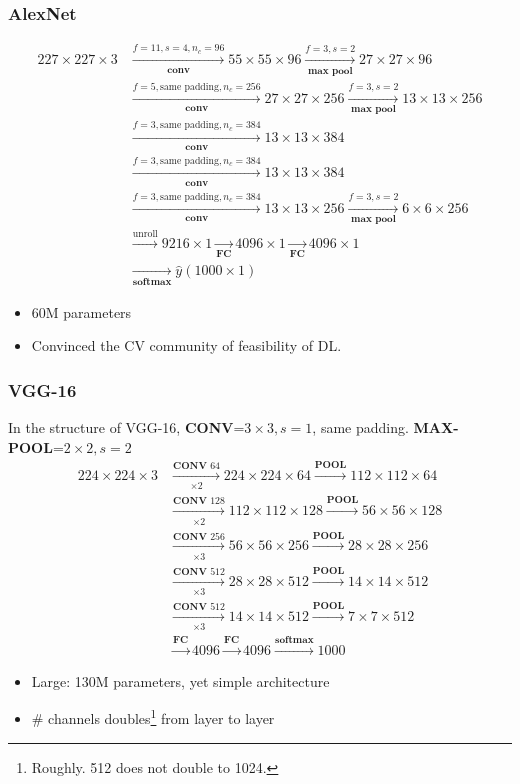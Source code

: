 \subsubsection{AlexNet}
\begin{align*}
  227\times 227\times 3&\xrightarrow[\textbf{conv}]{f=11,s=4,n_c=96}55\times 55\times 96\xrightarrow[\textbf{max pool}]{f=3,s=2}27\times 27\times 96\\
  &\xrightarrow[\textbf{conv}]{f=5,\text{same padding},n_c=256}27\times 27\times 256\xrightarrow[\textbf{max pool}]{f=3,s=2}13\times 13\times 256\\
  &\xrightarrow[\textbf{conv}]{f=3,\text{same padding},n_c=384}13\times 13\times 384\\
  &\xrightarrow[\textbf{conv}]{f=3,\text{same padding},n_c=384}13\times 13\times 384\\
  &\xrightarrow[\textbf{conv}]{f=3,\text{same padding},n_c=384}13\times 13\times 256\xrightarrow[\textbf{max pool}]{f=3,s=2}6\times 6\times 256\\
  &\xrightarrow{\text{unroll}}9216\times 1\xrightarrow[\textbf{FC}]{}4096\times 1\xrightarrow[\textbf{FC}]{}4096\times 1\\
  &\xrightarrow[\textbf{softmax}]{}\hat{y}(1000\times 1)
\end{align*}
\begin{itemize}
  \item 60M parameters
  \item Convinced the CV community of feasibility of DL.
\end{itemize}
\subsubsection{VGG-16}
In the structure of VGG-16, \textbf{CONV}=$3\times 3, s=1$, same padding. \textbf{MAX-POOL}=$2\times 2, s=2$
\begin{align*}
  224\times 224\times 3&\xrightarrow[\times 2]{\textbf{CONV } 64}224\times 224\times 64\xrightarrow{\textbf{POOL}}112\times 112\times 64\\
  &\xrightarrow[\times 2]{\textbf{CONV } 128}112\times 112\times 128\xrightarrow{\textbf{POOL}}56\times 56\times 128\\
  &\xrightarrow[\times 3]{\textbf{CONV } 256}56\times 56\times 256\xrightarrow{\textbf{POOL}}28\times 28\times 256\\
  &\xrightarrow[\times 3]{\textbf{CONV } 512}28\times 28\times 512\xrightarrow{\textbf{POOL}}14\times 14\times 512\\
  &\xrightarrow[\times 3]{\textbf{CONV } 512}14\times 14\times 512\xrightarrow{\textbf{POOL}}7\times 7\times 512\\
  &\xrightarrow{\textbf{FC}}4096\xrightarrow{\textbf{FC}}4096\xrightarrow{\textbf{softmax}}1000
\end{align*}
\begin{itemize}
  \item Large: 130M parameters, yet simple architecture
  \item \# channels doubles\footnote{Roughly. 512 does not double to 1024.} from layer to layer
\end{itemize}
